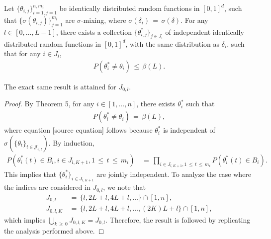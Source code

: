 \documentclass[twoside,11pt]{article}
\makeatletter
\newcommand{\discardlabel}[1]{}
\newcommand{\discardtwo}[2]{}
\newcommand{\legacyref}[1]{\textup{[source ref.]}}
\newcommand{\legacyeqref}[1]{\textup{[source equation]}}
\newenvironment{legacycomparison}{%
  \begingroup\color{legacygray}%
  \let\label\discardlabel
  \let\originallabel\discardlabel
  \let\ref\legacyref
  \let\pageref\legacyref
  \let\eqref\legacyeqref
  \let\cref\legacyref
  \let\Cref\legacyref
  \let\autoref\legacyref
  \let\aliasref\discardtwo
}{\endgroup}
\newcommand{\aliasref}[2]{%
  \@ifundefined{r@#2}{}{%
    \expandafter\let\csname r@#1\expandafter\endcsname\csname r@#2\endcsname}}
\makeatother
\begin{document}
\begin{legacycomparison}
\begin{lemma}
\label{Lemma 11.} Let \(\{\theta_{i,j}\}_{i=1,j=1}^{n,m_i}\) be identically distributed random functions in \([0,1]^d\), such that \(\{\sigma(\theta_{i,j})\}_{j=1}^{m_i}\) are \(\sigma\)-mixing, where \(\sigma(\delta_i) \,=\, \sigma(\delta)\). For any \(l \in [0, \ldots, L-1]\), there exists a collection \(\{\theta_{i,j}^*\}_{j \in J_{l}}\) of independent identically distributed random functions in \([0,1]^d\), with the same distribution as \(\delta_i\), such that for any \(i \in J_{l}\),
\begin{align}
    P(\theta_{i}^* \neq \theta_i) \,\leq\, \beta(L). \label{eq:independence_lemma}
\end{align}

The exact same result is attained for \(J_{0,l}\).
\end{lemma}
\begin{proof} By Theorem 5, for any \(i \in [1, \ldots, n]\), there exists \(\theta_{i}^*\) such that
\begin{align}
    P(\theta_{i}^* \neq \theta_i) \,=\, \beta(L), \label{eq:theorem_application}
\end{align}
where equation \eqref{eq:theorem_application} follows because \(\theta_{i}^*\) is independent of \(\sigma(\{\theta_{t}\}_{t \in \mathcal{J}_{e,l}})\). By induction,
\begin{align}
    P(\theta_{i}^*(t) \in B_{i}, i \in J_{l,K+1}, 1 \,\leq\, t \,\leq\, m_i) &\,=\, \prod_{i \in J_{l,K+1}, 1 \,\leq\, t \,\leq\, m_i} P(\theta_{i}^*(t) \in B_{i}). \label{eq:independence_joint}
\end{align}
This implies that \(\{\theta_{i}^*\}_{i\in J_{l,K+1}}\) are jointly independent. To analyze the case where the indices are considered in \(J_{0,l}\), we note that
\begin{align}
    J_{0,l} &\,=\, \{l, 2L + l, 4L + l, \ldots\} \cap [1,n], \\
    J_{0,l,K} &\,=\, \{l, 2L + l, 4L + l, \ldots, (2K)L + l\} \cap [1,n],
\end{align}
which implies \(\bigcup_{k \,\geq\, 0} J_{0,l,K} = J_{0,l}\). Therefore, the result is followed by replicating the analysis performed above. 
\end{proof}






\vskip 0.2in
\end{legacycomparison}
\end{document}
